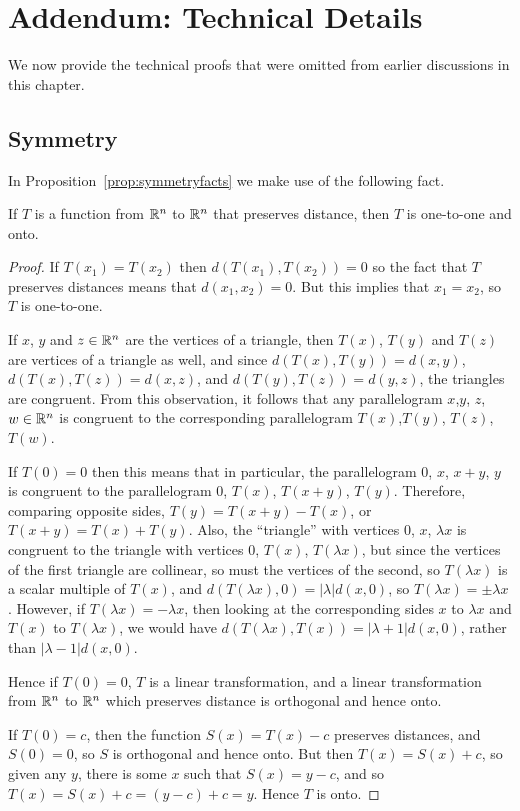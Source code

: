 \section{Addendum: Technical Details}

We now provide the technical proofs that were omitted from earlier discussions
in this chapter.

\subsection{Symmetry}

In Proposition~\ref{prop:symmetryfacts} we make use of the following fact.

\begin{lemma}\label{lemma:isometrybijective}
  If $T$ is a function from $\mathbb{R}^{n}$ to $\mathbb{R}^{n}$ that preserves
  distance, then $T$ is one-to-one and onto.
\end{lemma}
\begin{proof}
  If $T(x_{1}) = T(x_{2})$ then $d(T(x_{1}), T(x_{2})) = 0$ so the fact that
$T$ preserves distances means that $d(x_{1}, x_{2}) = 0$.  But this implies
that $x_{1} = x_{2}$, so $T$ is one-to-one.

  If $x$, $y$ and $z \in \mathbb{R}^{n}$ are the vertices of a triangle, then
  $T(x)$, $T(y)$ and $T(z)$ are vertices of a triangle as well, and since
  $d(T(x), T(y)) = d(x,y)$, $d(T(x), T(z)) = d(x,z)$, and $d(T(y), T(z)) =
  d(y,z)$, the triangles are congruent.  From this observation, it follows
  that any parallelogram $x$,$y$, $z$, $w \in \mathbb{R}^{n}$ is congruent to the
  corresponding parallelogram $T(x)$,$T(y)$, $T(z)$, $T(w)$.

  If $T(0) = 0$ then this means that in particular, the parallelogram
  $0$, $x$, $x+y$, $y$ is congruent to the parallelogram $0$, $T(x)$, $T(x+y)$,
  $T(y)$.  Therefore, comparing opposite sides, $T(y) = T(x+y) - T(x)$, or
  $T(x+y) = T(x) + T(y)$.  Also, the ``triangle'' with vertices $0$, $x$,
  $\lambda x$ is congruent to the triangle with vertices $0$, $T(x)$,
  $T(\lambda x)$, but since the vertices of the first triangle are collinear,
  so must the vertices of the second, so $T(\lambda x)$ is a scalar multiple
  of $T(x)$, and $d(T(\lambda x), 0) = |\lambda| d(x,0)$, so $T(\lambda x) =
  \pm \lambda x$.  However, if $T(\lambda x) = -\lambda x$, then looking
  at the corresponding sides $x$ to $\lambda x$ and $T(x)$ to $T(\lambda x)$,
  we would have $d(T(\lambda x),T(x)) = |\lambda + 1| d(x,0)$, rather than
  $|\lambda - 1| d(x,0)$.
  
  Hence if $T(0) = 0$, $T$ is a linear transformation, and a linear transformation
  from $\mathbb{R}^{n}$ to $\mathbb{R}^{n}$ which preserves distance is orthogonal
  and hence onto.
  
  If $T(0) = c$, then the function $S(x) = T(x) - c$ preserves distances, and
  $S(0) = 0$, so $S$ is orthogonal and hence onto.  But then $T(x) = S(x) + c$,
  so given any $y$, there is some $x$ such that $S(x) = y-c$, and so $T(x) =
  S(x) + c = (y-c) + c = y$.  Hence $T$ is onto.
\end{proof}

